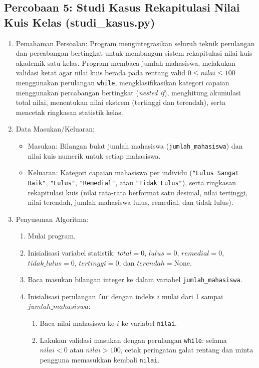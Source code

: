 \documentclass[12pt,a4paper]{article}
\begin{document}
\subsection{Percobaan 5: Studi Kasus Rekapitulasi Nilai Kuis Kelas (studi\_kasus.py)}
\begin{enumerate}
    \item Pemahaman Persoalan: Program mengintegrasikan seluruh teknik perulangan dan percabangan bertingkat untuk membangun sistem rekapitulasi nilai kuis akademik satu kelas. Program membaca jumlah mahasiswa, melakukan validasi ketat agar nilai kuis berada pada rentang valid $0 \le nilai \le 100$ menggunakan perulangan \texttt{while}, mengklasifikasikan kategori capaian menggunakan percabangan bertingkat (\textit{nested if}), menghitung akumulasi total nilai, menentukan nilai ekstrem (tertinggi dan terendah), serta mencetak ringkasan statistik kelas.
    \item Data Masukan/Keluaran:
    \begin{itemize}
        \item Masukan: Bilangan bulat jumlah mahasiswa (\texttt{jumlah\_mahasiswa}) dan nilai kuis numerik untuk setiap mahasiswa.
        \item Keluaran: Kategori capaian mahasiswa per individu (\texttt{"Lulus Sangat Baik"}, \texttt{"Lulus"}, \texttt{"Remedial"}, atau \texttt{"Tidak Lulus"}), serta ringkasan rekapitulasi kuis (nilai rata-rata berformat satu desimal, nilai tertinggi, nilai terendah, jumlah mahasiswa lulus, remedial, dan tidak lulus).
    \end{itemize}
    \item Penyusunan Algoritma:
    \begin{enumerate}[label=\alph*.]
        \item Mulai program.
        \item Inisialisasi variabel statistik: $total = 0$, $lulus = 0$, $remedial = 0$, $tidak\_lulus = 0$, $tertinggi = 0$, dan $terendah = \text{None}$.
        \item Baca masukan bilangan integer ke dalam variabel \texttt{jumlah\_mahasiswa}.
        \item Inisialisasi perulangan \texttt{for} dengan indeks $i$ mulai dari 1 sampai $jumlah\_mahasiswa$:
        \begin{enumerate}[label=\roman*.]
            \item Baca nilai mahasiswa ke-$i$ ke variabel \texttt{nilai}.
            \item Lakukan validasi masukan dengan perulangan \texttt{while}: selama $nilai < 0$ atau $nilai > 100$, cetak peringatan galat rentang dan minta pengguna memasukkan kembali \texttt{nilai}.

\end{enumerate}
\end{enumerate}
\end{enumerate}
\end{document}
